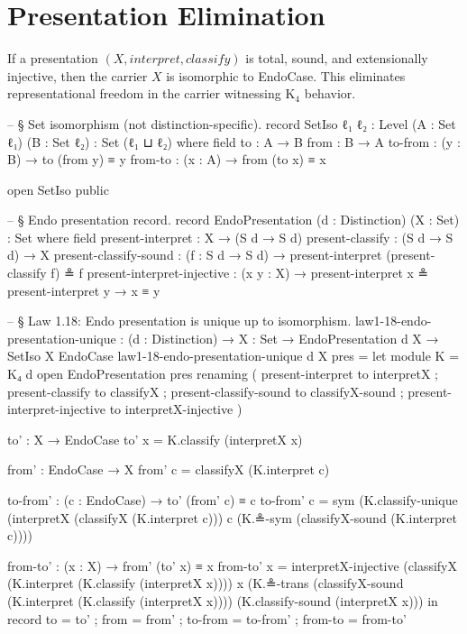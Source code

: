 \documentclass[11pt,a4paper]{book}
\def\texttt#1{#1}%
\begin{document}
\section{Presentation Elimination}

If a presentation $(X, \mathit{interpret}, \mathit{classify})$ is total, sound, and extensionally injective, then the carrier $X$ is isomorphic to \texttt{EndoCase}. This eliminates representational freedom in the carrier witnessing K$_4$ behavior.

\begin{code}
-- § Set isomorphism (not distinction-specific).
record SetIso {ℓ₁ ℓ₂ : Level} (A : Set ℓ₁) (B : Set ℓ₂) : Set (ℓ₁ ⊔ ℓ₂) where
  field
    to      : A → B
    from    : B → A
    to-from : (y : B) → to (from y) ≡ y
    from-to : (x : A) → from (to x) ≡ x

open SetIso public

-- § Endo presentation record.
record EndoPresentation (d : Distinction) (X : Set) : Set where
  field
    present-interpret           : X → (S d → S d)
    present-classify            : (S d → S d) → X
    present-classify-sound      : (f : S d → S d) → present-interpret (present-classify f) ≗ f
    present-interpret-injective : (x y : X) → present-interpret x ≗ present-interpret y → x ≡ y

-- § Law 1.18: Endo presentation is unique up to isomorphism.
law1-18-endo-presentation-unique :
  (d : Distinction) →
  {X : Set} →
  EndoPresentation d X →
  SetIso X EndoCase
law1-18-endo-presentation-unique d {X} pres =
  let
    module K = K₄ d
    open EndoPresentation pres
      renaming
        ( present-interpret to interpretX
        ; present-classify to classifyX
        ; present-classify-sound to classifyX-sound
        ; present-interpret-injective to interpretX-injective
        )

    to' : X → EndoCase
    to' x = K.classify (interpretX x)

    from' : EndoCase → X
    from' c = classifyX (K.interpret c)

    to-from' : (c : EndoCase) → to' (from' c) ≡ c
    to-from' c =
      sym
        (K.classify-unique
          (interpretX (classifyX (K.interpret c)))
          c
          (K.≗-sym (classifyX-sound (K.interpret c))))

    from-to' : (x : X) → from' (to' x) ≡ x
    from-to' x =
      interpretX-injective
        (classifyX (K.interpret (K.classify (interpretX x))))
        x
        (K.≗-trans
          (classifyX-sound (K.interpret (K.classify (interpretX x))))
          (K.classify-sound (interpretX x)))
  in
  record
    { to = to'
    ; from = from'
    ; to-from = to-from'
    ; from-to = from-to'
    }
\end{code}
\end{document}
